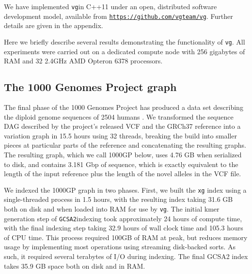 \documentclass[12pt]{article}
\newcommand{\vg}{{\tt vg}}
\newcommand{\gcsa}{{\tt GCSA2}}
\begin{document}


We have implemented \vg in C++11 under an open, distributed software development model, available from \href{https://github.com/vgteam/vg}{\tt https://github.com/vgteam/vg}.  Further details are given in the appendix.

Here we briefly describe several results demonstrating the functionality of \vg.
All experiments were carried out on a dedicated compute node with 256 gigabytes of RAM and 32 2.4GHz AMD Opteron 6378 processors.

\subsection{The 1000 Genomes Project graph}
\label{sec:1000g}

The final phase of the 1000 Genomes Project has produced a data set describing the diploid genome sequences of 2504 humans \cite{1000g2015}.
We transformed the sequence DAG described by the project's released VCF and the GRCh37 reference into a variation graph in 15.5 hours using 32 threads, breaking the build into smaller pieces at particular parts of the reference and concatenating the resulting graphs.
The resulting graph, which we call 1000GP below, uses 4.76 GB when serialized to disk, and contains 3.181 Gbp of sequence, which is exactly equivalent to the length of the input reference plus the length of the novel alleles in the VCF file.

We indexed the 1000GP graph in two phases.
First, we built the {\tt xg} index using a single-threaded process in 1.5 hours, with the resulting index taking 31.6 GB both on disk and when loaded into RAM for use by \vg.
The initial kmer generation step of  \gcsa indexing took approximately 24 hours of compute time, with the final indexing step taking 32.9 hours of wall clock time and 105.3 hours of CPU time.
This process required 100GB of RAM at peak, but reduces memory usage by implementing most operations using streaming disk-backed sorts.
As such, it required several terabytes of I/O during indexing.
The final GCSA2 index takes 35.9 GB space both on disk and in RAM.
\end{document}

